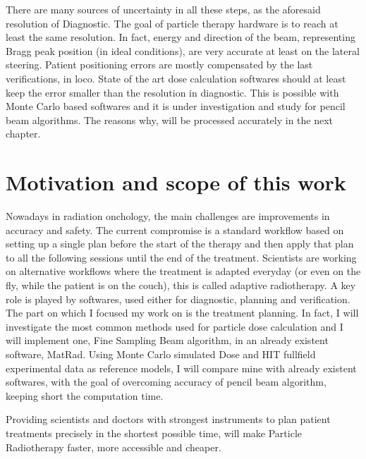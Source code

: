 \documentclass[12pt, a4paper, twoside]{book}
\begin{document}
There are many sources of uncertainty in all these steps, as the aforesaid resolution of Diagnostic. The goal of particle therapy hardware is to reach at least the same resolution. In fact, energy and direction of the beam, representing Bragg peak position (in ideal conditions), are very accurate at least on the lateral steering.
Patient positioning errors are mostly compensated by the last verifications, in loco.
State of the art dose calculation softwares should at least keep the error smaller than the resolution in diagnostic. This is possible with Monte Carlo based softwares and it is under investigation and study for pencil beam algorithms. The reasons why, will be processed accurately in the next chapter.



\section{Motivation and scope of this work} 
Nowadays in radiation onchology, the main challenges are improvements in accuracy and safety. 
The current compromise is a standard workflow based on setting up a single plan before the start of the therapy and then apply that plan to all the following sessions until the end of the treatment.
Scientists are working on alternative workflows where the treatment is adapted everyday (or even on the fly, while the patient is on the couch), this is called adaptive radiotherapy.
A key role is played by softwares, used either for diagnostic, planning and verification.
The part on which I focused my work on is the treatment planning. In fact, I will investigate the most common methods used for particle dose calculation and I will implement one, Fine Sampling Beam algorithm, in an already existent software, MatRad. 
Using Monte Carlo simulated Dose and HIT fullfield experimental data as reference models, I will compare mine with already existent softwares, with the goal of overcoming accuracy of pencil beam algorithm, keeping short the computation time.  

Providing scientists and doctors with strongest instruments to plan patient treatments precisely in the shortest possible time, will make Particle Radiotherapy faster, more accessible and cheaper.
\end{document}
